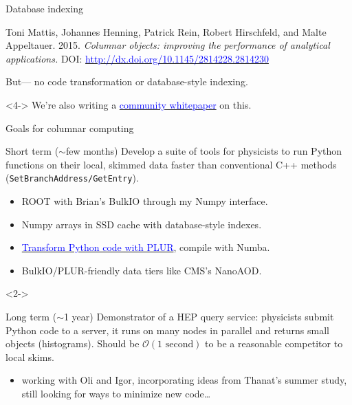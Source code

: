 \documentclass{beamer}
\begin{document}
\begin{frame}{Database indexing}
\begin{uncoverenv}
\begin{minipage}{\linewidth}
\scriptsize
Toni Mattis, Johannes Henning, Patrick Rein, Robert Hirschfeld, and Malte Appeltauer. 2015. {\it Columnar objects: improving the performance of analytical applications.} DOI: \href{http://dx.doi.org/10.1145/2814228.2814230}{\textcolor{blue}{http://dx.doi.org/10.1145/2814228.2814230}}
\end{minipage}

\vspace{0.1 cm}
But--- no code transformation or database-style indexing.
\end{uncoverenv}

\vspace{0.35 cm}
\begin{uncoverenv}<4->
We're also writing a \href{https://docs.google.com/document/d/1-ZrnsS3IZdH91_pb99OLGd4gxaMm3m3Vr7XBigpx8DE/edit?usp=sharing}{\textcolor{blue}{community whitepaper}} on this.
\end{uncoverenv}
\end{frame}

\begin{frame}{Goals for columnar computing}
\vspace{0.2 cm}
\begin{block}{Short term ($\sim$few months)}
Develop a suite of tools for physicists to run Python functions on their local, skimmed data faster than conventional C++ methods ({\tt\small SetBranchAddress/GetEntry}).
\begin{itemize}
\item ROOT with Brian's BulkIO through my Numpy interface.
\item Numpy arrays in SSD cache with database-style indexes.
\item \href{https://github.com/diana-hep/plur}{\textcolor{blue}{Transform Python code with PLUR}}, compile with Numba.
\item BulkIO/PLUR-friendly data tiers like CMS's NanoAOD.
\end{itemize}
\end{block}

\vspace{-0.2 cm}
\begin{uncoverenv}<2->
\begin{block}{Long term ($\sim$1 year)}
Demonstrator of a HEP query service: physicists submit Python code to a server, it runs on many nodes in parallel and returns small objects (histograms). Should be $\mathcal{O}({\mbox{1 second}})$ to be a reasonable competitor to local skims.
\begin{itemize}
\item working with Oli and Igor, incorporating ideas from Thanat's summer study, still looking for ways to minimize new code\ldots
\end{itemize}
\end{block}
\end{uncoverenv}
\end{frame}
\end{document}
